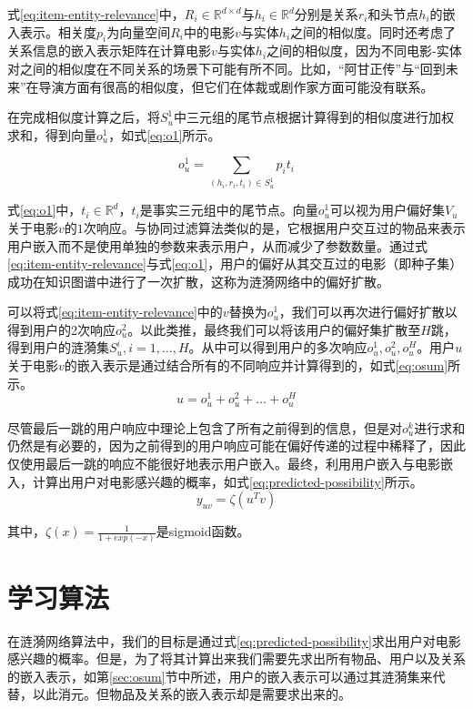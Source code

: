 \documentclass{bjfuthesis}
\begin{document}
式\eqref{eq:item-entity-relevance}中，$R_i\in \mathbb{R}^{d\times d}$与$h_i\in \mathbb{R}^d$分别是关系$r_i$和头节点$h_i$的嵌入表示。相关度$p_i$为向量空间$R_i$中的电影$v$与实体$h_i$之间的相似度。同时还考虑了关系信息的嵌入表示矩阵在计算电影$v$与实体$h_i$之间的相似度，因为不同电影-实体对之间的相似度在不同关系的场景下可能有所不同。比如，“阿甘正传”与“回到未来”在导演方面有很高的相似度，但它们在体裁或剧作家方面可能没有联系。

在完成相似度计算之后，将$S_u^{1}$中三元组的尾节点根据计算得到的相似度进行加权求和，得到向量$o^{1}_u$，如式\eqref{eq:o1}所示。

\begin{equation}
	o^1_u=\sum_{(h_i,r_i,t_i)\in S_u^1}p_it_i\label{eq:o1}
\end{equation}

式\eqref{eq:o1}中，$t_i\in \mathbb{R}^{d}$，$t_i$是事实三元组中的尾节点。向量$o^{1}_u$可以视为用户偏好集$V_u$关于电影$v$的$1$次响应。与协同过滤算法类似的是，它根据用户交互过的物品来表示用户嵌入而不是使用单独的参数来表示用户，从而减少了参数数量。通过式\eqref{eq:item-entity-relevance}与式\eqref{eq:o1}，用户的偏好从其交互过的电影（即种子集）成功在知识图谱中进行了一次扩散，这称为涟漪网络中的偏好扩散。

可以将式\eqref{eq:item-entity-relevance}中的$v$替换为$o_u^1$，我们可以再次进行偏好扩散以得到用户的2次响应$o_u^2$。以此类推，最终我们可以将该用户的偏好集扩散至$H$跳，得到用户的涟漪集$S_u^{i}, i=1,\dots,H$。从中可以得到用户的多次响应$o^{1}_u, o^{2}_u, o^{H}_u$。用户$u$关于电影$v$的嵌入表示是通过结合所有的不同响应并计算得到的，如式\eqref{eq:osum}所示。
\begin{equation}
	u=o_u^1+o_u^2+\dots+o_u^H\label{eq:osum}
\end{equation}

尽管最后一跳的用户响应中理论上包含了所有之前得到的信息，但是对$o^k_u$进行求和仍然是有必要的，因为之前得到的用户响应可能在偏好传递的过程中稀释了，因此仅使用最后一跳的响应不能很好地表示用户嵌入。最终，利用用户嵌入与电影嵌入，计算出用户对电影感兴趣的概率，如式\eqref{eq:predicted-possibility}所示。
\begin{equation}
	y_{uv}=\zeta(u^Tv)\label{eq:predicted-possibility}
\end{equation}

其中，$\zeta(x)=\frac{1}{1+exp(-x)}$是sigmoid函数。
\section{学习算法}
在涟漪网络算法中，我们的目标是通过式\eqref{eq:predicted-possibility}求出用户对电影感兴趣的概率。但是，为了将其计算出来我们需要先求出所有物品、用户以及关系的嵌入表示，如第\ref{sec:osum}节中所述，用户的嵌入表示可以通过其涟漪集来代替，以此消元。但物品及关系的嵌入表示却是需要求出来的。
\end{document}
